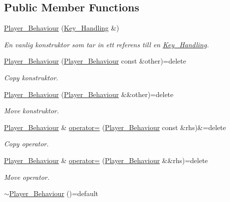 \subsection*{Public Member Functions}
\begin{DoxyCompactItemize}
\item 
\hyperlink{classPlayer__Behaviour_af2ac9398d19327733bfc83e672782580}{Player\+\_\+\+Behaviour} (\hyperlink{classKey__Handling}{Key\+\_\+\+Handling} \&)
\begin{DoxyCompactList}\small\item\em En vanlig konstruktor som tar in ett referens till en \hyperlink{classKey__Handling}{Key\+\_\+\+Handling}. \end{DoxyCompactList}\item 
\hyperlink{classPlayer__Behaviour_a4f7527788db7e0077f46a5c3f80639fa}{Player\+\_\+\+Behaviour} (\hyperlink{classPlayer__Behaviour}{Player\+\_\+\+Behaviour} const \&other)=delete
\begin{DoxyCompactList}\small\item\em Copy konstruktor. \end{DoxyCompactList}\item 
\hyperlink{classPlayer__Behaviour_a8060453cd5b18254154d986bd5c31a0b}{Player\+\_\+\+Behaviour} (\hyperlink{classPlayer__Behaviour}{Player\+\_\+\+Behaviour} \&\&other)=delete
\begin{DoxyCompactList}\small\item\em Move konstruktor. \end{DoxyCompactList}\item 
\hyperlink{classPlayer__Behaviour}{Player\+\_\+\+Behaviour} \& \hyperlink{classPlayer__Behaviour_a313984f091f92701d0a890e8643398a8}{operator=} (\hyperlink{classPlayer__Behaviour}{Player\+\_\+\+Behaviour} const \&rhs)\&=delete
\begin{DoxyCompactList}\small\item\em Copy operator. \end{DoxyCompactList}\item 
\hyperlink{classPlayer__Behaviour}{Player\+\_\+\+Behaviour} \& \hyperlink{classPlayer__Behaviour_acccc40229c43598189255bac420e0f8f}{operator=} (\hyperlink{classPlayer__Behaviour}{Player\+\_\+\+Behaviour} \&\&rhs)=delete
\begin{DoxyCompactList}\small\item\em Move operator. \end{DoxyCompactList}\item 
\hyperlink{classPlayer__Behaviour_a776d896d15ebce163770778d192404c4}{$\sim$\+Player\+\_\+\+Behaviour} ()=default

\end{DoxyCompactItemize}
